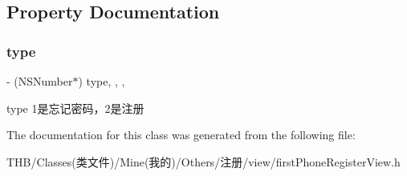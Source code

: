 \subsection{Property Documentation}
\mbox{\label{interfacefirst_phone_register_view_a6d20f9336d32db450350fd1e76e39c7c}} 
\subsubsection{\texorpdfstring{type}{type}}
{\footnotesize\ttfamily -\/ (N\+S\+Number$\ast$) type\hspace{0.3cm}{\ttfamily [read]}, {\ttfamily [write]}, {\ttfamily [nonatomic]}, {\ttfamily [assign]}}

type 1是忘记密码，2是注册 

The documentation for this class was generated from the following file\+:\begin{DoxyCompactItemize}
\item 
T\+H\+B/\+Classes(类文件)/\+Mine(我的)/\+Others/注册/view/first\+Phone\+Register\+View.\+h\end{DoxyCompactItemize}

